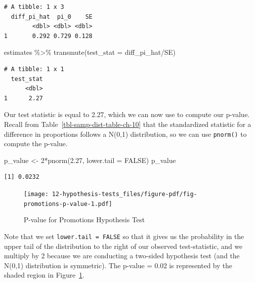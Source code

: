 \documentclass[
  letterpaper,
  DIV=11,
  numbers=noendperiod]{scrreprt}
\newenvironment{Shaded}{\begin{snugshade}}{\end{snugshade}}
\newcommand{\AttributeTok}[1]{\textcolor[rgb]{0.40,0.45,0.13}{#1}}
\newcommand{\ConstantTok}[1]{\textcolor[rgb]{0.56,0.35,0.01}{#1}}
\newcommand{\DecValTok}[1]{\textcolor[rgb]{0.68,0.00,0.00}{#1}}
\newcommand{\FloatTok}[1]{\textcolor[rgb]{0.68,0.00,0.00}{#1}}
\newcommand{\FunctionTok}[1]{\textcolor[rgb]{0.28,0.35,0.67}{#1}}
\newcommand{\NormalTok}[1]{\textcolor[rgb]{0.00,0.23,0.31}{#1}}
\newcommand{\OtherTok}[1]{\textcolor[rgb]{0.00,0.23,0.31}{#1}}
\newcommand{\SpecialCharTok}[1]{\textcolor[rgb]{0.37,0.37,0.37}{#1}}
\theoremstyle{definition}
\theoremstyle{remark}
\begin{document}
\begin{verbatim}
# A tibble: 1 x 3
  diff_pi_hat  pi_0    SE
        <dbl> <dbl> <dbl>
1       0.292 0.729 0.128
\end{verbatim}

\begin{Shaded}
\begin{Highlighting}[]
\NormalTok{estimates }\SpecialCharTok{\%\textgreater{}\%} 
  \FunctionTok{transmute}\NormalTok{(}\AttributeTok{test\_stat =}\NormalTok{ diff\_pi\_hat}\SpecialCharTok{/}\NormalTok{SE)}
\end{Highlighting}
\end{Shaded}

\begin{verbatim}
# A tibble: 1 x 1
  test_stat
      <dbl>
1      2.27
\end{verbatim}

Our test statistic is equal to 2.27, which we can now use to compute our
p-value. Recall from Table~\ref{tbl-samp-dist-table-ch-10} that the
standardized statistic for a difference in proportions follows a N(0,1)
distribution, so we can use \texttt{pnorm()} to compute the p-value.

\begin{Shaded}
\begin{Highlighting}[]
\NormalTok{p\_value }\OtherTok{\textless{}{-}} \DecValTok{2}\SpecialCharTok{*}\FunctionTok{pnorm}\NormalTok{(}\FloatTok{2.27}\NormalTok{, }\AttributeTok{lower.tail =} \ConstantTok{FALSE}\NormalTok{)}
\NormalTok{p\_value}
\end{Highlighting}
\end{Shaded}

\begin{verbatim}
[1] 0.0232
\end{verbatim}

\begin{figure}

{\centering \texttt{[image: 12-hypothesis-tests\_files/figure-pdf/fig-promotions-p-value-1.pdf]}

}

\caption{\label{fig-promotions-p-value}P-value for Promotions Hypothesis
Test}

\end{figure}

Note that we set \texttt{lower.tail\ =\ FALSE} so that it gives us the
probability in the upper tail of the distribution to the right of our
observed test-statistic, and we multiply by 2 because we are conducting
a two-sided hypothesis test (and the N(0,1) distribution is symmetric).
The p-value = 0.02 is represented by the shaded region in
Figure~\ref{fig-promotions-p-value}.
\end{document}
